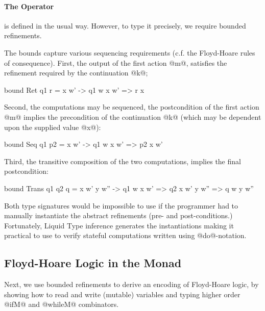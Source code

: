 \paragraph{The \bind Operator} is defined in the usual way.
However, to type it precisely, we require bounded refinements.
%
%
The bounds capture various sequencing requirements 
(c.f. the Floyd-Hoare rules of consequence).
%
First, the output of the first action @m@, 
satisfies the refinement required by the 
continuation @k@;
%
\begin{code}
  bound Ret q1 r = \w x w' -> q1 w x w' => r x 
\end{code}
%
Second, the computations may be sequenced,
\ie the postcondition of the first action 
@m@ implies the precondition of the 
continuation @k@ (which may be dependent 
upon the supplied value @x@):
% 
\begin{code}
  bound Seq q1 p2 = \w x w' -> 
        q1 w x w' => p2 x w'
\end{code}%
%
Third, the transitive composition of the two 
computations, implies the final postcondition:
%
\begin{code}
  bound Trans q1 q2 q = \w x w' y w'' -> 
        q1 w x w' => q2 x w' y w'' => q w y w''
\end{code}
  
Both type signatures would be impossible 
to use if the programmer had to manually 
instantiate the abstract refinements 
(\ie pre- and post-conditions.) 
%
Fortunately, Liquid Type inference %
generates the instantiations making it practical
to use \toolname to verify stateful computations
written using @do@-notation.

\subsection{Floyd-Hoare Logic in the \RIO Monad}
\label{subsec:state:examples}

Next, we use bounded refinements to derive an
encoding of Floyd-Hoare logic, by showing how to 
read and write (mutable) variables and
typing higher order 
@ifM@ and @whileM@ combinators.

